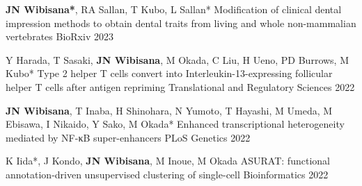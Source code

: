 



\begin{cventries}

  \cventrypub
    {\textbf{JN Wibisana*}, RA Sallan, T Kubo, L Sallan*} %
    {Modification of clinical dental impression methods to obtain dental traits from living and whole non-mammalian vertebrates} %
    {BioRxiv} %
    {2023} %

  \cventrypub
    {Y Harada, T Sasaki, \textbf{JN Wibisana}, M Okada, C Liu, H Ueno, PD Burrows, M Kubo*} %
    {Type 2 helper T cells convert into Interleukin-13-expressing follicular helper T cells after antigen repriming} %
    {Translational and Regulatory Sciences} %
    {2022} %


  \cventrypub
    {\textbf{JN Wibisana}, T Inaba, H Shinohara, N Yumoto, T Hayashi, M Umeda, M Ebisawa, I Nikaido, Y Sako, M Okada*} %
    {Enhanced transcriptional heterogeneity mediated by NF-κB super-enhancers} %
    {PLoS Genetics} %
    {2022} %

  \cventrypublast
    {K Iida*, J Kondo, \textbf{JN Wibisana}, M Inoue, M Okada} %
    {ASURAT: functional annotation-driven unsupervised clustering of single-cell} %
    {Bioinformatics} %
    {2022} %


\end{cventries}



